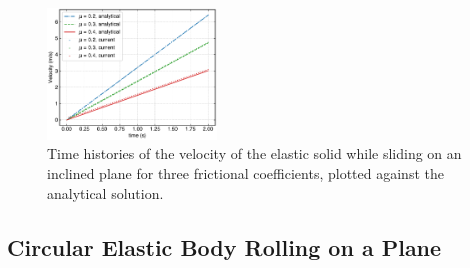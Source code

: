 \begin{figure}[!htpb]
  \centering
  \includegraphics[width=0.4\textwidth]{figures/csph/figures/mohseni_2021_free_sliding_on_a_slope/velocity_vs_time}
  \caption{Time histories of the velocity of the elastic solid while sliding on
    an inclined plane for three frictional coefficients, plotted against the
    analytical solution.}
\label{fig:results-solid-sliding-velocity-vs-time}
\end{figure}


\FloatBarrier%
\subsection{Circular Elastic Body Rolling on a Plane}
\label{sec:de-cylinder}

